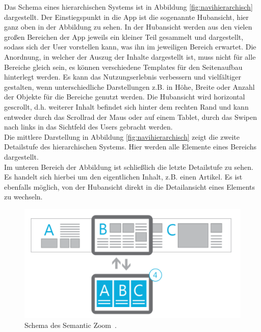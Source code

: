 \documentclass[12pt,a4paper,bibtotoc,abstracton]{scrartcl}
\begin{document}
Das Schema eines hierarchischen Systems ist in Abbildung \ref{fig:navihierarchisch} dargestellt. Der Einstiegspunkt in die App ist die sogenannte \glqq Hubansicht\grqq, hier ganz oben in der Abbildung zu sehen. In der Hubansicht werden aus den vielen großen Bereichen der App jeweils ein kleiner Teil gesammelt und dargestellt, sodass sich der User vorstellen kann, was ihn im jeweiligen Bereich erwartet. Die Anordnung, in welcher der Auszug der Inhalte dargestellt ist, muss nicht für alle Bereiche gleich sein, es können verschiedene Templates für den Seitenaufbau hinterlegt werden. Es kann das Nutzungserlebnis verbessern und vielfältiger gestalten, wenn unterschiedliche Darstellungen z.B. in Höhe, Breite oder Anzahl der Objekte für die Bereiche genutzt werden. Die Hubansicht wird horizontal gescrollt, d.h. weiterer Inhalt befindet sich hinter dem rechten Rand und kann entweder durch das Scrollrad der Maus oder auf einem Tablet, durch das Swipen nach links in das Sichtfeld des Users gebracht werden.\\
Die mittlere Darstellung in Abbildung \ref{fig:navihierarchisch} zeigt die zweite Detailstufe des hierarchischen Systems. Hier werden alle Elemente eines Bereichs dargestellt.\\
Im unteren Bereich der Abbildung ist schließlich die letzte Detailstufe zu sehen. Es handelt sich hierbei um den eigentlichen Inhalt, z.B. einen Artikel. Es ist ebenfalls möglich, von der Hubansicht direkt in die Detailansicht eines Elements zu wechseln.  

\begin{figure}[h]	
	\centering
	\includegraphics[scale=1]{Bilder/Abbildungen/ms_navigation_hierarchie_semantic_zoom} 
	\caption{Schema des \glqq Semantic Zoom\grqq\ \protect\citep{MicrosoftNavidesign2013}.}
	\label{fig:semanticzoomkonzept}
\end{figure}
\end{document}
